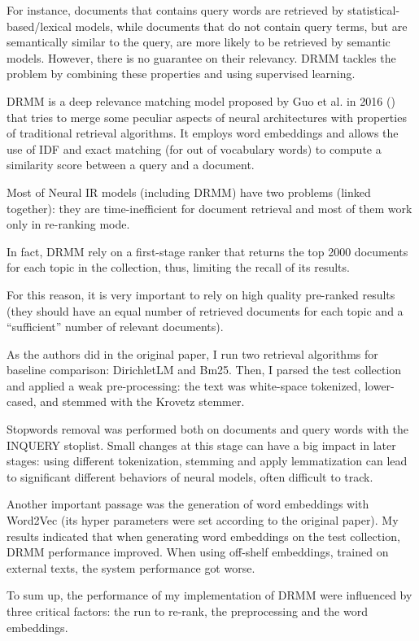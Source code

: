 For instance, documents that contains query words are retrieved by statistical-based/lexical models, while documents that do not contain query terms, but are semantically similar to the query, are more likely to be retrieved by semantic models. However, there is no guarantee on their relevancy. DRMM tackles the problem by combining these properties and using supervised learning.

DRMM is a deep relevance matching model proposed by Guo et al. in 2016 (\cite{drmm}) that tries to merge some peculiar aspects of neural architectures with properties of traditional retrieval algorithms. It employs word embeddings and allows the use of IDF and exact matching (for out of vocabulary words) to compute a similarity score between a query and a document.

Most of Neural IR models (including DRMM) have two problems (linked together): they are time-inefficient for document retrieval and most of them work only in re-ranking mode.

In fact, DRMM rely on a first-stage ranker that returns the top 2000 documents for each topic in the collection, thus, limiting the recall of its results.

For this reason, it is very important to rely on high quality pre-ranked results (they should have an equal number of retrieved documents for each topic and a ``sufficient'' number of relevant documents).

As the authors did in the original paper, I run two retrieval algorithms for baseline comparison: DirichletLM and Bm25. Then, I parsed the test collection and applied a weak pre-processing: the text was white-space tokenized, lower-cased, and stemmed with the Krovetz stemmer.

Stopwords removal was performed both on documents and query words with the INQUERY stoplist. Small changes at this stage can have a big impact in later stages: using different tokenization, stemming and apply lemmatization can lead to significant different behaviors of neural models, often difficult to track.

Another important passage was the generation of word embeddings with Word2Vec (its hyper parameters were set according to the original paper). My results indicated that when generating word embeddings on the test collection, DRMM performance improved. When using off-shelf embeddings, trained on external texts, the system performance got worse.

To sum up, the performance of my implementation of DRMM were influenced by three critical factors: the run to re-rank, the preprocessing and the word embeddings.

